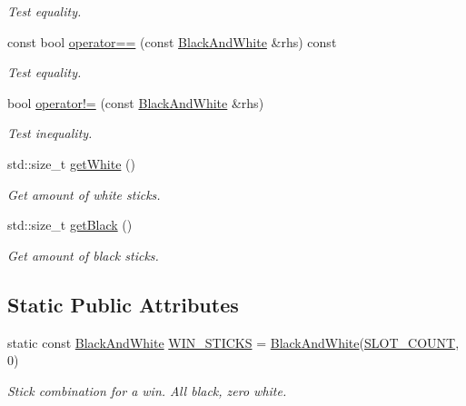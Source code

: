 \begin{DoxyCompactItemize}
\begin{DoxyCompactList}\small\item\em Test equality. \end{DoxyCompactList}\item 
const bool \hyperlink{classmastermind_1_1logic_1_1_black_and_white_a3487a018a0165166c3d351562cd946d7}{operator==} (const \hyperlink{classmastermind_1_1logic_1_1_black_and_white}{Black\+And\+White} \&rhs) const
\begin{DoxyCompactList}\small\item\em Test equality. \end{DoxyCompactList}\item 
bool \hyperlink{classmastermind_1_1logic_1_1_black_and_white_afd44562f412b49a86c51ffedea05c108}{operator!=} (const \hyperlink{classmastermind_1_1logic_1_1_black_and_white}{Black\+And\+White} \&rhs)
\begin{DoxyCompactList}\small\item\em Test inequality. \end{DoxyCompactList}\item 
std\+::size\+\_\+t \hyperlink{classmastermind_1_1logic_1_1_black_and_white_a7ef40ad0a450a643e4def4b11b8e7e72}{get\+White} ()
\begin{DoxyCompactList}\small\item\em Get amount of white sticks. \end{DoxyCompactList}\item 
std\+::size\+\_\+t \hyperlink{classmastermind_1_1logic_1_1_black_and_white_a4ad1275ddb85c2bc5dd3c88943a69d4a}{get\+Black} ()
\begin{DoxyCompactList}\small\item\em Get amount of black sticks. \end{DoxyCompactList}\end{DoxyCompactItemize}
\subsection*{Static Public Attributes}
\begin{DoxyCompactItemize}
\item 
\hypertarget{classmastermind_1_1logic_1_1_black_and_white_a9c0ca1063cd6e8d41b0d87d510de33f5}{}\label{classmastermind_1_1logic_1_1_black_and_white_a9c0ca1063cd6e8d41b0d87d510de33f5} 
static const \hyperlink{classmastermind_1_1logic_1_1_black_and_white}{Black\+And\+White} \hyperlink{classmastermind_1_1logic_1_1_black_and_white_a9c0ca1063cd6e8d41b0d87d510de33f5}{W\+I\+N\+\_\+\+S\+T\+I\+C\+KS} = \hyperlink{classmastermind_1_1logic_1_1_black_and_white}{Black\+And\+White}(\hyperlink{classmastermind_1_1_mastermind_ad4cfc8127641ff8dfe89d65ae232331c}{S\+L\+O\+T\+\_\+\+C\+O\+U\+NT}, 0)
\begin{DoxyCompactList}\small\item\em Stick combination for a win. All black, zero white. \end{DoxyCompactList}\end{DoxyCompactItemize}

